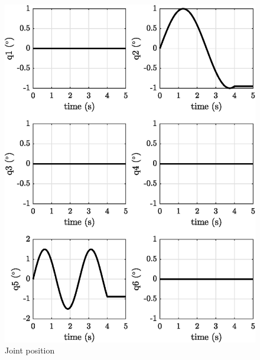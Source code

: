 \documentclass[12pt, a4paper]{article}
\begin{document}
\begin{figure}
    \centering
    \includegraphics{images/exp1.1/joint_position.eps}
    \caption{Joint position}
    \label{fig:joint_position}
\end{figure}
\end{document}
